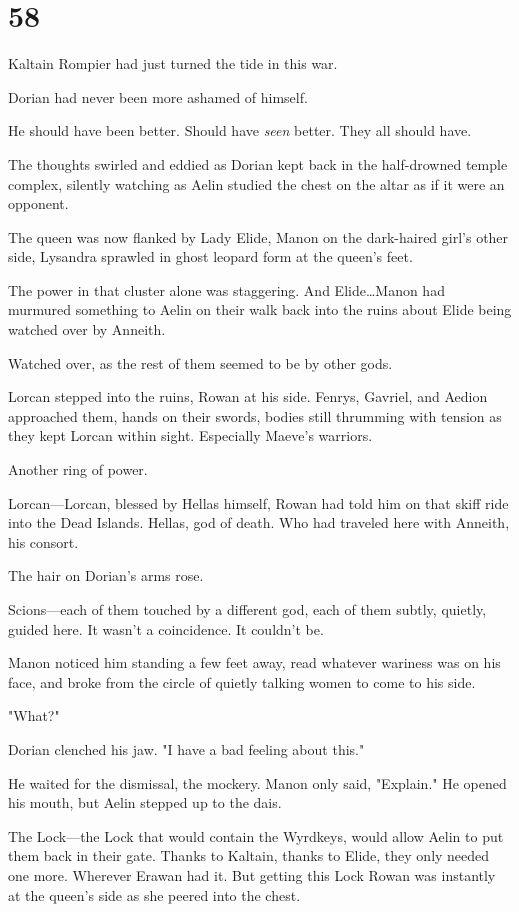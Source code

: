 
\chapter{58}

Kaltain Rompier had just turned the tide in this war.

Dorian had never been more ashamed of himself.

He should have been better.
Should have \emph{seen} better.
They all should have.

The thoughts swirled and eddied as Dorian kept back in the half-drowned temple complex, silently watching as Aelin studied the chest on the altar as if it were an opponent.

The queen was now flanked by Lady Elide, Manon on the dark-haired girl's other side, Lysandra sprawled in ghost leopard form at the queen's feet.

The power in that cluster alone was staggering.
And Elide\ldots Manon had murmured something to Aelin on their walk back into the ruins about Elide being watched over by Anneith.

Watched over, as the rest of them seemed to be by other gods.

Lorcan stepped into the ruins, Rowan at his side.
Fenrys, Gavriel, and Aedion approached them, hands on their swords, bodies still thrumming with tension as they kept Lorcan within sight.
Especially Maeve's warriors.

Another ring of power.

Lorcan---Lorcan, blessed by Hellas himself, Rowan had told him on that skiff ride into the Dead Islands.
Hellas, god of death.
Who had traveled here with Anneith, his consort.

The hair on Dorian's arms rose.

Scions---each of them touched by a different god, each of them subtly, quietly, guided here.
It wasn't a coincidence.
It couldn't be.

Manon noticed him standing a few feet away, read whatever wariness was on his face, and broke from the circle of quietly talking women to come to his side.

"What?"

Dorian clenched his jaw.
"I have a bad feeling about this."

He waited for the dismissal, the mockery.
Manon only said, "Explain."
He opened his mouth, but Aelin stepped up to the dais.

The Lock---the Lock that would contain the Wyrdkeys, would allow Aelin to put them back in their gate.
Thanks to Kaltain, thanks to Elide, they only needed one more.
Wherever Erawan had it.
But getting this Lock 
Rowan was instantly at the queen's side as she peered into the chest.


